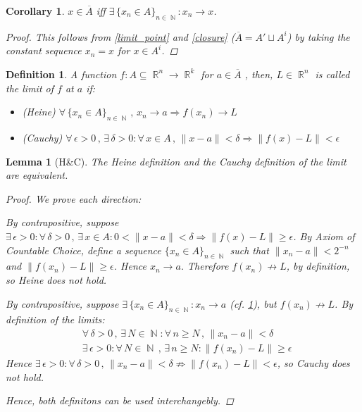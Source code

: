 \documentclass[12pt]{article}
\let\RA\Rightarrow
\let\LA\Leftarrow
\let\ee\epsilon
\newcommand{\Forall}[1]{\forall\,{#1}\,,\,}
\newcommand{\Exist}[1]{\exists\,{#1}:}
\DeclareMathOperator{\R}{\mathbb{R}}
\DeclareMathOperator{\N}{\mathbb{N}}
\newcommand{\seq}[2]{\{{#1}\}_{#2\in\N}}
\newcommand{\cl}[1]{\overline{#1}}
\newtheorem{definition}[theorem]{Definition}
\newtheorem{lemma}[theorem]{Lemma}
\newtheorem{corollary}[theorem]{Corollary}
\begin{document}
\begin{corollary}
  \label{closed_limit}
  $x\in\cl{A}$ iff $\Exist{\seq{x_n\in A}{n}}x_n\to x$.
  \begin{proof}
    This follows from \ref{limit_point} and \ref{closure} ($\cl{A}=A'\sqcup A^i$) by taking the constant sequence $x_n=x$ for $x\in A^i$.
  \end{proof}
\end{corollary}

\begin{definition}
  \label{fn_limit}
  A function $f:A\subseteq \R^n\to \R^k$ for $a\in\cl{A}$ , then, $L\in\R^n$ is called the limit of $f$ at $a$ if:
  \begin{itemize}
    \item[](Heine) $\Forall{\seq{x_n\in A}{n}} x_n\to a \RA f(x_n)\to L$
    \item[](Cauchy) $\Forall{\ee>0}\Exist{\delta>0}\Forall{x\in A}\|x-a\|<\delta\RA \|f(x)-L\|<\ee$
  \end{itemize}
\end{definition}

\begin{lemma}[H\&C]
  The Heine definition and the Cauchy definition of the limit are equivalent.
  \begin{proof}
    We prove each direction:
    \begin{compactitem}
      \item[$(\RA)$] By contrapositive, suppose $\Exist{\ee>0}\Forall{\delta>0}\Exist{x\in A}0<\|x-a\|<\delta\RA \|f(x)-L\|\geq \ee$. By Axiom of Countable Choice, define a sequence $\seq{x_n\in A}{n}$ such that $\|x_n-a\|<2^{-n}$ and $\|f(x_n)-L\|\geq \ee$. Hence $x_n\to a$. Therefore $f(x_n)\not\to L$, by definition, so Heine does not hold.
      \item[$(\LA)$] By contrapositive, suppose $\Exist{\seq{x_n\in A}{n}}x_n\to a$ (cf. \ref{closed_limit}), but $f(x_n)\not\to L$. By definition of the limits:
      \begin{align*}
        &\Forall{\delta>0}\Exist{N\in\N}\Forall{n\geq N}\|x_n-a\|<\delta\\
        &\Exist{\ee>0}\Forall{N\in\N}\Exist{n\geq N}\|f(x_n)-L\|\geq \ee
      \end{align*}
      Hence $\Exist{\ee>0}\Forall{\delta>0}\|x_n-a\|<\delta\not\RA\|f(x_n)-L\|<\ee$, so Cauchy does not hold.
    \end{compactitem}
    Hence, both definitons can be used interchangebly.
  \end{proof}
\end{lemma}
\end{document}
